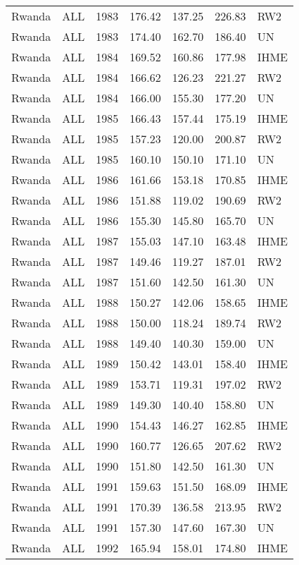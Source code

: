 \begin{longtable}{lllrrrl}
  Rwanda & ALL & 1983 & 176.42 & 137.25 & 226.83 & RW2 \\ 
  Rwanda & ALL & 1983 & 174.40 & 162.70 & 186.40 & UN \\ 
  Rwanda & ALL & 1984 & 169.52 & 160.86 & 177.98 & IHME \\ 
  Rwanda & ALL & 1984 & 166.62 & 126.23 & 221.27 & RW2 \\ 
  Rwanda & ALL & 1984 & 166.00 & 155.30 & 177.20 & UN \\ 
  Rwanda & ALL & 1985 & 166.43 & 157.44 & 175.19 & IHME \\ 
  Rwanda & ALL & 1985 & 157.23 & 120.00 & 200.87 & RW2 \\ 
  Rwanda & ALL & 1985 & 160.10 & 150.10 & 171.10 & UN \\ 
  Rwanda & ALL & 1986 & 161.66 & 153.18 & 170.85 & IHME \\ 
  Rwanda & ALL & 1986 & 151.88 & 119.02 & 190.69 & RW2 \\ 
  Rwanda & ALL & 1986 & 155.30 & 145.80 & 165.70 & UN \\ 
  Rwanda & ALL & 1987 & 155.03 & 147.10 & 163.48 & IHME \\ 
  Rwanda & ALL & 1987 & 149.46 & 119.27 & 187.01 & RW2 \\ 
  Rwanda & ALL & 1987 & 151.60 & 142.50 & 161.30 & UN \\ 
  Rwanda & ALL & 1988 & 150.27 & 142.06 & 158.65 & IHME \\ 
  Rwanda & ALL & 1988 & 150.00 & 118.24 & 189.74 & RW2 \\ 
  Rwanda & ALL & 1988 & 149.40 & 140.30 & 159.00 & UN \\ 
  Rwanda & ALL & 1989 & 150.42 & 143.01 & 158.40 & IHME \\ 
  Rwanda & ALL & 1989 & 153.71 & 119.31 & 197.02 & RW2 \\ 
  Rwanda & ALL & 1989 & 149.30 & 140.40 & 158.80 & UN \\ 
  Rwanda & ALL & 1990 & 154.43 & 146.27 & 162.85 & IHME \\ 
  Rwanda & ALL & 1990 & 160.77 & 126.65 & 207.62 & RW2 \\ 
  Rwanda & ALL & 1990 & 151.80 & 142.50 & 161.30 & UN \\ 
  Rwanda & ALL & 1991 & 159.63 & 151.50 & 168.09 & IHME \\ 
  Rwanda & ALL & 1991 & 170.39 & 136.58 & 213.95 & RW2 \\ 
  Rwanda & ALL & 1991 & 157.30 & 147.60 & 167.30 & UN \\ 
  Rwanda & ALL & 1992 & 165.94 & 158.01 & 174.80 & IHME \\ 

\end{longtable}
